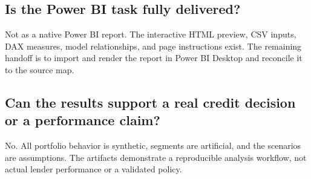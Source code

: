 \documentclass[11pt]{article}
\begin{document}
\subsection*{Is the Power BI task fully delivered?}
Not as a native Power BI report. The interactive HTML preview, CSV inputs, DAX measures, model relationships, and page instructions exist. The remaining handoff is to import and render the report in Power BI Desktop and reconcile it to the source map.

\subsection*{Can the results support a real credit decision or a performance claim?}
No. All portfolio behavior is synthetic, segments are artificial, and the scenarios are assumptions. The artifacts demonstrate a reproducible analysis workflow, not actual lender performance or a validated policy.
\end{document}
